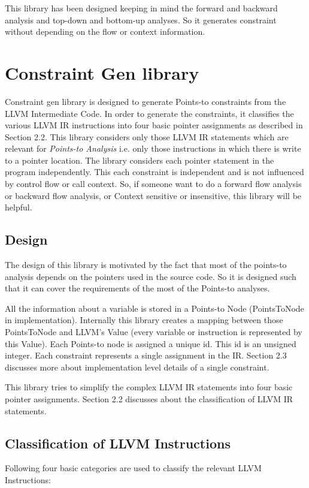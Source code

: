 \documentclass[a4paper,11pt]{report}
\begin{document}
This library has been designed keeping in mind the forward and backward
analysis and top-down and bottom-up analyses. So it generates constraint
without depending on the flow or context information.

\chapter{Constraint Gen library}

Constraint gen library is designed to generate Points-to constraints from the
LLVM Intermediate Code. In order to generate the constraints, it classifies the
various LLVM IR instructions into four basic pointer assignments as described 
in Section 2.2. This library considers only those LLVM IR statements which are
relevant for \textit{Points-to Analysis} i.e. only those instructions in which 
there is write to a pointer location. The library considers each pointer statement in the 
program independently. This each constraint is independent and is not 
influenced by control flow or call context. So, if someone want to do a 
forward flow analysis or backward flow analysis, or Context sensitive or 
insensitive, this library will be helpful.


\section{Design}
The design of this library is motivated by the fact that most of the points-to 
analysis depends on the pointers used in the source code. So it is designed 
such that it can cover the requirements of the most of the Points-to analyses.

All the information about a variable is stored in a Points-to Node 
(PointsToNode in implementation). Internally this library creates a mapping 
between those PointsToNode and LLVM's Value (every variable or instruction is 
represented by this Value). Each Points-to node is assigned a unique id. This 
id is an unsigned integer. Each constraint represents a single assignment in 
the IR. Section 2.3 discusses more about implementation level details 
of a single constraint.

This library tries to simplify the complex LLVM IR statements into four basic 
pointer assignments. Section 2.2 discusses about the classification of LLVM IR 
statements.

\section{Classification of LLVM Instructions}
Following four basic categories are used to classify the relevant LLVM 
Instructions:
\end{document}
